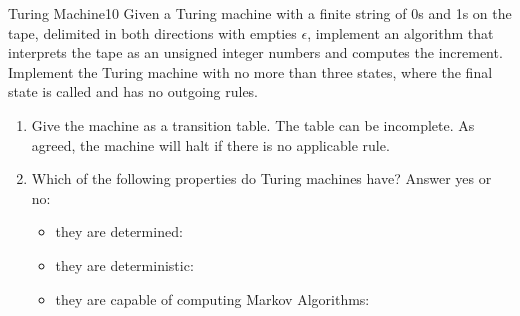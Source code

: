 \documentclass[a4paper,twoside]{article}
\begin{document}
\begin{task}{Turing Machine}{10}{}
  Given a Turing machine with a finite string of 0s and 1s on the tape, delimited in both directions with empties $\epsilon$,
  implement an algorithm that interprets the tape as an unsigned integer numbers and computes the increment.
  Implement the Turing machine with no more than three states, where the final state is called  and has no
  outgoing rules.

  \begin{enumerate}
  \item{Give the machine as a transition table. The table can be incomplete. As agreed, the machine will halt if there is no applicable rule. \vspace{10cm}}
  \item{Which of the following properties do Turing machines have? Answer yes or no:
    \begin{itemize}
    \item {they are determined: \vspace{1cm}}
    \item {they are deterministic:\vspace{1cm}}
    \item {they are capable of computing Markov Algorithms:\vspace{1cm}} 
    \end{itemize}
      }
  \end{enumerate}

  
  \end{task}
  \clearpage
  
\end{document}
